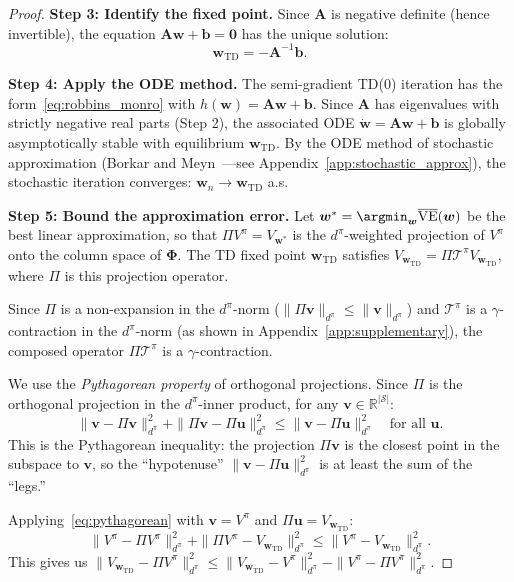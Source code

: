 \documentclass[11pt,a4paper]{article}
\theoremstyle{definition}
\theoremstyle{plain}
\theoremstyle{remark}
\newcommand{\R}{\mathbb{R}}
\begin{document}
\begin{proof}
\textbf{Step 3: Identify the fixed point.} Since $\bm{A}$ is negative definite (hence invertible), the equation $\bm{A}\bm{w} + \bm{b} = \bm{0}$ has the unique solution:
\begin{equation}
    \bm{w}_{\text{TD}} = -\bm{A}^{-1}\bm{b}.
    \label{eq:w_td}
\end{equation}

\textbf{Step 4: Apply the ODE method.} The semi-gradient TD(0) iteration has the form~\eqref{eq:robbins_monro} with $h(\bm{w}) = \bm{A}\bm{w} + \bm{b}$. Since $\bm{A}$ has eigenvalues with strictly negative real parts (Step 2), the associated ODE $\dot{\bm{w}} = \bm{A}\bm{w} + \bm{b}$ is globally asymptotically stable with equilibrium $\bm{w}_{\text{TD}}$. By the ODE method of stochastic approximation (Borkar and Meyn~\cite{borkar2000}---see Appendix~\ref{app:stochastic_approx}), the stochastic iteration converges: $\bm{w}_n \to \bm{w}_{\text{TD}}$ a.s.

\textbf{Step 5: Bound the approximation error.} Let $\bm{w}^* = \argmin_{\bm{w}} \overline{\text{VE}}(\bm{w})$ be the best linear approximation, so that $\Pi V^\pi = V_{\bm{w}^*}$ is the $d^\pi$-weighted projection of $V^\pi$ onto the column space of $\bm{\Phi}$. The TD fixed point $\bm{w}_{\text{TD}}$ satisfies $V_{\bm{w}_{\text{TD}}} = \Pi \mathcal{T}^\pi V_{\bm{w}_{\text{TD}}}$, where $\Pi$ is this projection operator.

Since $\Pi$ is a non-expansion in the $d^\pi$-norm ($\|\Pi \bm{v}\|_{d^\pi} \leq \|\bm{v}\|_{d^\pi}$) and $\mathcal{T}^\pi$ is a $\gamma$-contraction in the $d^\pi$-norm (as shown in Appendix~\ref{app:supplementary}), the composed operator $\Pi\mathcal{T}^\pi$ is a $\gamma$-contraction.

We use the \emph{Pythagorean property} of orthogonal projections. Since $\Pi$ is the orthogonal projection in the $d^\pi$-inner product, for any $\bm{v} \in \R^{|\mathcal{S}|}$:
\begin{equation}
    \|\bm{v} - \Pi\bm{v}\|_{d^\pi}^2 + \|\Pi\bm{v} - \Pi\bm{u}\|_{d^\pi}^2 \leq \|\bm{v} - \Pi\bm{u}\|_{d^\pi}^2 \quad \text{for all } \bm{u}.
    \label{eq:pythagorean}
\end{equation}
This is the Pythagorean inequality: the projection $\Pi\bm{v}$ is the closest point in the subspace to $\bm{v}$, so the ``hypotenuse'' $\|\bm{v} - \Pi\bm{u}\|_{d^\pi}^2$ is at least the sum of the ``legs.''

Applying~\eqref{eq:pythagorean} with $\bm{v} = V^\pi$ and $\Pi\bm{u} = V_{\bm{w}_{\text{TD}}}$:
\begin{equation}
    \|V^\pi - \Pi V^\pi\|_{d^\pi}^2 + \|\Pi V^\pi - V_{\bm{w}_{\text{TD}}}\|_{d^\pi}^2 \leq \|V^\pi - V_{\bm{w}_{\text{TD}}}\|_{d^\pi}^2.
    \label{eq:pythag_applied}
\end{equation}
This gives us $\|V_{\bm{w}_{\text{TD}}} - \Pi V^\pi\|_{d^\pi}^2 \leq \|V_{\bm{w}_{\text{TD}}} - V^\pi\|_{d^\pi}^2 - \|V^\pi - \Pi V^\pi\|_{d^\pi}^2$.


\end{proof}
\end{document}
